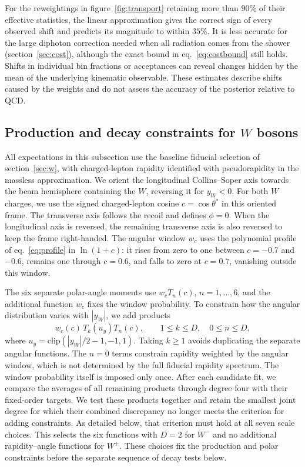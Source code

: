 For the reweightings in figure~\ref{fig:transport} retaining more than $90\%$ of their effective statistics, the linear approximation gives the correct sign of every observed shift and predicts its magnitude to within $35\%$. It is less accurate for the large diphoton correction needed when all radiation comes from the shower (section~\ref{sec:cost}), although the exact bound in eq.~\eqref{eq:costbound} still holds. Shifts in individual bin fractions or acceptances can reveal changes hidden by the mean of the underlying kinematic observable. These estimates describe shifts caused by the weights and do not assess the accuracy of the posterior relative to QCD.


\subsection{Production and decay constraints for \texorpdfstring{$W$}{W} bosons}
\label{app:wjoint}

All expectations in this subsection use the baseline fiducial selection of section~\ref{sec:w}, with charged-lepton rapidity identified with pseudorapidity in the massless approximation. We orient the longitudinal Collins--Soper axis towards the beam hemisphere containing the $W$, reversing it for $y_W<0$. For both $W$ charges, we use the signed charged-lepton cosine $c=\cos\theta^{*}$ in this oriented frame. The transverse axis follows the recoil and defines $\phi=0$. When the longitudinal axis is reversed, the remaining transverse axis is also reversed to keep the frame right-handed. The angular window $w_c$ uses the polynomial profile of eq.~\eqref{eq:profile} in $\ln(1+c)$: it rises from zero to one between $c=-0.7$ and $-0.6$, remains one through $c=0.6$, and falls to zero at $c=0.7$, vanishing outside this window.

The six separate polar-angle moments use $w_cT_n(c)$, $n=1,\ldots,6$, and the additional function $w_c$ fixes the window probability. To constrain how the angular distribution varies with $|y_W|$, we add products
\begin{equation}
w_c(c)\,T_k(u_y)T_n(c),
\qquad 1\le k\le D,\quad 0\le n\le D,
\label{eq:wjoint}
\end{equation}
where $u_y=\mathrm{clip}(|y_W|/2-1,-1,1)$. Taking $k\ge1$ avoids duplicating the separate angular functions. The $n=0$ terms constrain rapidity weighted by the angular window, which is not determined by the full fiducial rapidity spectrum. The window probability itself is imposed only once. After each candidate fit, we compare the averages of all remaining products through degree four with their fixed-order targets. We test these products together and retain the smallest joint degree for which their combined discrepancy no longer meets the criterion for adding constraints. As detailed below, that criterion must hold at all seven scale choices. This selects the six functions with $D=2$ for $W^{-}$ and no additional rapidity--angle functions for $W^{+}$. These choices fix the production and polar constraints before the separate sequence of decay tests below.

